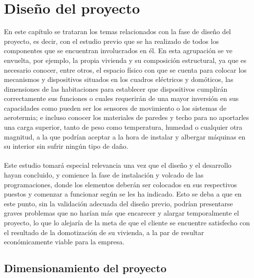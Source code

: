 \chapter{Diseño del proyecto}

En este capítulo se trataran los temas relacionados con la fase de diseño del proyecto, es decir, con el estudio previo que se ha realizado de todos los componentes que se encuentran involucrados en él. En esta agrupación se ve envuelta, por ejemplo, la propia vivienda y su composición estructural, ya que es necesario conocer, entre otros, el espacio físico con que se cuenta para colocar los mecanismos y dispositivos situados en los cuadros eléctricos y domóticos, las dimensiones de las habitaciones para establecer que dispositivos cumplirán correctamente sus funciones o cuales requerirán de una mayor inversión en sus capacidades como pueden ser los sensores de movimiento o los sistemas de aerotermia; e incluso conocer los materiales de paredes y techo para no aportarles una carga superior, tanto de peso como temperatura, humedad o cualquier otra magnitud, a la que podrían aceptar a la hora de instalar y albergar máquinas en su interior sin sufrir ningún tipo de daño.\\\\
Este estudio tomará especial relevancia una vez que el diseño y el desarrollo hayan concluido, y comience la fase de instalación y volcado de las programaciones, donde los elementos deberán ser colocados en sus respectivos puestos y comenzar a funcionar según se les ha indicado. Esto se deba a que en este punto, sin la validación adecuada del diseño previo, podrían presentarse graves problemas que no harían más que encarecer y alargar temporalmente el proyecto, lo que lo alejaría de la meta de que el cliente se encuentre satisfecho con el resultado de la domotización de su vivienda, a la par de resultar económicamente viable para la empresa.


\section{Dimensionamiento del proyecto}

